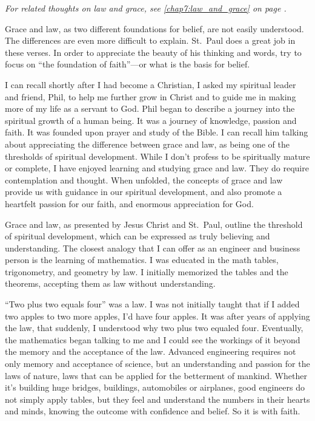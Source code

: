\documentclass[12pt]{memoir}
\begin{document}
\begin{center}
\emph{For related thoughts on law and grace, see \ref{chap7:law_and_grace} on page \pageref{chap7:law_and_grace}.}
\end{center}

Grace and law, as two different foundations for belief, are not easily
understood. The differences are even more difficult to explain.
St.~Paul does a great job in these verses. In order to appreciate the
beauty of his thinking and words, try to focus on ``the foundation
of faith''---or what is the basis for belief.

I can recall shortly after I had become a Christian, I asked my spiritual
leader and friend, Phil, to help me further grow in Christ and to
guide me in making more of my life as a servant to God. Phil began
to describe a journey into the spiritual growth of a human being.
It was a journey of knowledge, passion and faith. It was founded upon
prayer and study of the Bible. I can recall him talking about appreciating
the difference between grace and law, as being one of the thresholds of spiritual development. While I don't profess to be spiritually
mature or complete, I have enjoyed learning and studying grace and
law. They do require contemplation and thought. When unfolded,
the concepts of grace and law provide us with guidance in our spiritual
development, and also promote a heartfelt passion for our faith, and
enormous appreciation for God.

Grace and law, as presented by Jesus Christ and St.~Paul, outline
the threshold of spiritual development, which can be expressed as
truly believing and understanding. The closest analogy that
I can offer as an engineer and business person is the learning of
mathematics. I was educated in the math tables, trigonometry, and geometry
by law. I initially memorized the tables and the theorems, accepting
them as law without understanding.

``Two plus two equals four'' was a law. I was not initially taught that if I added two apples to
two more apples, I'd have four apples. It was after years of applying
the law, that suddenly, I understood why two plus two equaled four.
Eventually, the mathematics began talking to me and I could
see the workings of it beyond the memory and the acceptance of the
law. Advanced engineering requires not only memory and acceptance
of science, but an understanding and passion for the laws of nature, laws that can be applied for the betterment of mankind. Whether it's building
huge bridges, buildings, automobiles or airplanes, good engineers
do not simply apply tables, but they feel and understand the numbers
in their hearts and minds, knowing the outcome with confidence and
belief. So it is with faith.
\end{document}
